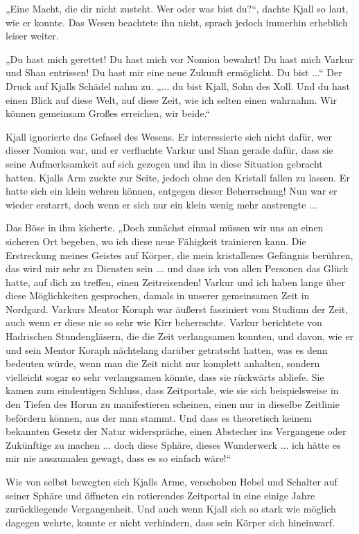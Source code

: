 \documentclass[10pt, a4paper, oneside]{book}
\begin{document}
„Eine Macht, die dir nicht zusteht. Wer oder was bist du?“, dachte Kjall so laut, wie er konnte. Das Wesen beachtete ihn nicht, sprach jedoch immerhin erheblich leiser weiter.

„Du hast mich gerettet! Du hast mich vor Nomion bewahrt! Du hast mich Varkur und Shan entrissen! Du hast mir eine neue Zukunft ermöglicht. Du bist ...“ Der Druck auf Kjalls Schädel nahm zu. „... du bist Kjall, Sohn des Xoll. Und du hast einen Blick auf diese Welt, auf diese Zeit, wie ich selten einen wahrnahm. Wir können gemeinsam Großes erreichen, wir beide.“

Kjall ignorierte das Gefasel des Wesens. Er interessierte sich nicht dafür, wer dieser Nomion war, und er verfluchte Varkur und Shan gerade dafür, dass sie seine Aufmerksamkeit auf sich gezogen und ihn in diese Situation gebracht hatten. Kjalls Arm zuckte zur Seite, jedoch ohne den Kristall fallen zu lassen. Er hatte sich ein klein wehren können, entgegen dieser Beherrschung! Nun war er wieder erstarrt, doch wenn er sich nur ein klein wenig mehr anstrengte ...

Das Böse in ihm kicherte. „Doch zunächst einmal müssen wir uns an einen sicheren Ort begeben, wo ich diese neue Fähigkeit trainieren kann. Die Erstreckung meines Geistes auf Körper, die mein kristallenes Gefängnis berühren, das wird mir sehr zu Diensten sein ... und dass ich von allen Personen das Glück hatte, auf dich zu treffen, einen Zeitreisenden! Varkur und ich haben lange über diese Möglichkeiten gesprochen, damals in unserer gemeinsamen Zeit in Nordgard. Varkurs Mentor Koraph war äußerst fasziniert vom Studium der Zeit, auch wenn er diese nie so sehr wie Kirr beherrschte. Varkur berichtete von Hadrischen Stundengläsern, die die Zeit verlangsamen konnten, und davon, wie er und sein Mentor Koraph nächtelang darüber getratscht hatten, was es denn bedeuten würde, wenn man die Zeit nicht nur komplett anhalten, sondern vielleicht sogar so sehr verlangsamen könnte, dass sie rückwärts abliefe. Sie kamen zum eindeutigen Schluss, dass Zeitportale, wie sie sich beispielsweise in den Tiefen des Horun zu manifestieren scheinen, einen nur in dieselbe Zeitlinie befördern können, aus der man stammt. Und dass es theoretisch keinem bekannten Gesetz der Natur widerspräche, einen Abstecher ins Vergangene oder Zukünftige zu machen ... doch diese Sphäre, dieses Wunderwerk ... ich hätte es mir nie auszumalen gewagt, dass es so einfach wäre!“

Wie von selbst bewegten sich Kjalls Arme, verschoben Hebel und Schalter auf seiner Sphäre und öffneten ein rotierendes Zeitportal in eine einige Jahre zurückliegende Vergangenheit. Und auch wenn Kjall sich so stark wie möglich dagegen wehrte, konnte er nicht verhindern, dass sein Körper sich hineinwarf.
\end{document}
